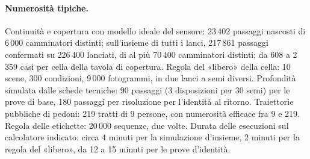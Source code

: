 \paragraph{Numerosità tipiche.} Continuità e copertura con modello ideale del sensore: 23\,402 passaggi nascosti di 6\,000 camminatori distinti; sull'insieme di tutti i lanci, 217\,861 passaggi confermati su 226\,400 lanciati, di al più 70\,400 camminatori distinti; da 608 a 2\,359 casi per cella della tavola di copertura. Regola del «libero» della cella: 10 scene, 300 condizioni, 9\,000 fotogrammi, in due lanci a semi diversi. Profondità simulata dalle schede tecniche: 90 passaggi (3 disposizioni per 30 semi) per le prove di base, 180 passaggi per risoluzione per l'identità al ritorno. Traiettorie pubbliche di pedoni: 219 tratti di 9 persone, con numerosità efficace fra 9 e 219. Regola delle etichette: 20\,000 sequenze, due volte. Durata delle esecuzioni sul calcolatore indicato: circa 4 minuti per la simulazione d'insieme, 2 minuti per la regola del «libero», da 12 a 15 minuti per le prove d'identità.

